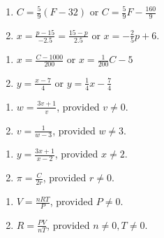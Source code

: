 \documentclass{ximera}
\begin{document}
\begin{multicols}{2}
\begin{enumerate}
\setcounter{enumi}{\value{HW}}
\item  $C = \frac{5}{9}(F - 32)$ or  $C = \frac{5}{9} F - \frac{160}{9}$
\item  $x = \frac{p - 15}{-2.5} = \frac{15-p}{2.5}$ or $x = -\frac{2}{5} p + 6$.
\setcounter{HW}{\value{enumi}}
\end{enumerate}
\end{multicols}

\begin{multicols}{2}
\begin{enumerate}
\setcounter{enumi}{\value{HW}}
\item  $x = \frac{C - 1000}{200}$ or $x = \frac{1}{200} C - 5$
\item  $y = \frac{x-7}{4}$ or $y = \frac{1}{4} x - \frac{7}{4}$
\setcounter{HW}{\value{enumi}}
\end{enumerate}
\end{multicols}


\begin{multicols}{2}
\begin{enumerate}
\setcounter{enumi}{\value{HW}}
\item  $w = \frac{3v+1}{v}$, provided $v \neq 0$.
\item  $v = \frac{1}{w-3}$, provided $w \neq 3$.
\setcounter{HW}{\value{enumi}}
\end{enumerate}
\end{multicols}

\begin{multicols}{2}
\begin{enumerate}
\setcounter{enumi}{\value{HW}}
\item $y = \frac{3x+1}{x-2}$, provided $x \neq 2$.
\item $\pi = \frac{C}{2r}$, provided $r \neq 0$.


\setcounter{HW}{\value{enumi}}
\end{enumerate}
\end{multicols}


\begin{multicols}{2}
\begin{enumerate}
\setcounter{enumi}{\value{HW}}
\item $V = \frac{nRT}{P}$, provided $P \neq 0$.
\item $R = \frac{PV}{nT}$, provided $n \neq 0, T \neq 0$.
\setcounter{HW}{\value{enumi}}
\end{enumerate}
\end{multicols}
\end{document}
